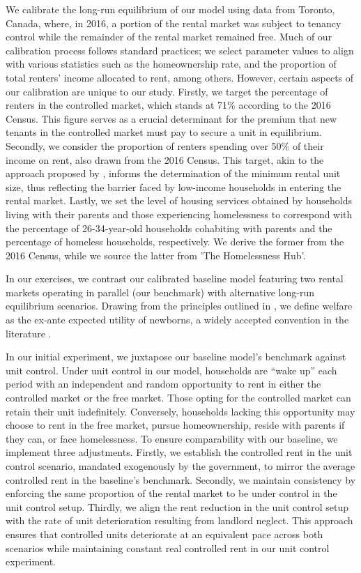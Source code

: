 \documentclass[parskip=full]{article}
\begin{document}
We calibrate the long-run equilibrium of our model using data from Toronto, Canada, where, in 2016, a portion of the rental market was subject to tenancy control while the remainder of the rental market remained free. Much of our calibration process follows standard practices; we select parameter values to align with various statistics such as the homeownership rate, and the proportion of total renters' income allocated to rent, among others. However, certain aspects of our calibration are unique to our study. Firstly, we target the percentage of renters in the controlled market, which stands at 71\% according to the 2016 Census. This figure serves as a crucial determinant for the premium that new tenants in the controlled market must pay to secure a unit in equilibrium. Secondly, we consider the proportion of renters spending over 50\% of their income on rent, also drawn from the 2016 Census. This target, akin to the approach proposed by \citet{rs-2023}, informs the determination of the minimum rental unit size, thus reflecting the barrier faced by low-income households in entering the rental market. Lastly, we set the level of housing services obtained by households living with their parents and those experiencing homelessness to correspond with the percentage of 26-34-year-old households cohabiting with parents and the percentage of homeless households, respectively. We derive the former from the 2016 Census, while we source the latter from 'The Homelessness Hub'.

In our exercises, we contrast our calibrated baseline model featuring two rental markets operating in parallel (our benchmark) with alternative long-run equilibrium scenarios. Drawing from the principles outlined in \citet{ralws-1971}, we define welfare as the ex-ante expected utility of newborns, a widely accepted convention in the literature \citep{conesa-et-al,gkkoc}.

In our initial experiment, we juxtapose our baseline model's benchmark against unit control. Under unit control in our model, households are ``wake up'' each period with an independent and random opportunity to rent in either the controlled market or the free market. Those opting for the controlled market can retain their unit indefinitely. Conversely, households lacking this opportunity may choose to rent in the free market, pursue homeownership, reside with parents if they can, or face homelessness. To ensure comparability with our baseline, we implement three adjustments. Firstly, we establish the controlled rent in the unit control scenario, mandated exogenously by the government, to mirror the average controlled rent in the baseline's benchmark. Secondly, we maintain consistency by enforcing the same proportion of the rental market to be under control in the unit control setup. Thirdly, we align the rent reduction in the unit control setup with the rate of unit deterioration resulting from landlord neglect. This approach ensures that controlled units deteriorate at an equivalent pace across both scenarios while maintaining constant real controlled rent in our unit control experiment.
\end{document}
